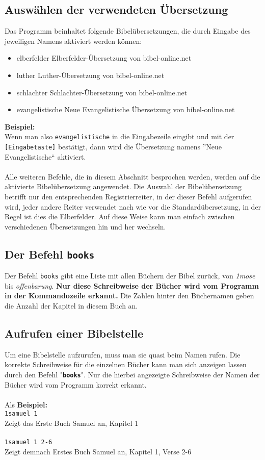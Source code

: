 \documentclass[a4paper]{scrartcl}
\let\origitem\item
\renewcommand{\item}{\normalfont\origitem}
\newcommand{\ttitem}{\normalfont\ttfamily\origitem}
\begin{document}
\subsection{Auswählen der verwendeten Übersetzung}

Das Programm beinhaltet folgende Bibelübersetzungen, die durch Eingabe des jeweiligen Namens aktiviert werden können:

\begin{itemize}
\ttitem elberfelder
	\subitem Elberfelder-Übersetzung von bibel-online.net
\ttitem luther
	\subitem Luther-Übersetzung von bibel-online.net
\ttitem schlachter
	\subitem Schlachter-Übersetzung von bibel-online.net
\ttitem evangelistische
	\subitem Neue Evangelistische Übersetzung von bibel-online.net
\end{itemize}
\noindent
\textbf{Beispiel:}\\
Wenn man also \texttt{evangelistische} in die Eingabezeile eingibt und mit der \texttt{[Eingabetaste]} bestätigt, dann wird die Übersetzung namens ''Neue Evangelistische`` aktiviert.\\
\\ \noindent
Alle weiteren Befehle, die in diesem Abschnitt besprochen werden, werden auf die aktivierte Bibelübersetzung angewendet. Die Auswahl der Bibelübersetzung betrifft nur den entsprechenden Registrierreiter, in der dieser Befehl aufgerufen wird, jeder andere Reiter verwendet nach wie vor die Standardübersetzung, in der Regel ist dies die Elberfelder. Auf diese Weise kann man einfach zwischen verschiedenen Übersetzungen hin und her wechseln.

\subsection{Der Befehl \texttt{books}}

Der Befehl \texttt{books} gibt eine Liste mit allen Büchern der Bibel zurück, von \textit{1mose} bis \textit{offenbarung}. \textbf{Nur diese Schreibweise der Bücher wird vom Programm in der Kommandozeile erkannt.} Die Zahlen hinter den Büchernamen geben die Anzahl der Kapitel in diesem Buch an.

\subsection{Aufrufen einer Bibelstelle}

Um eine Bibelstelle aufzurufen, muss man sie quasi beim Namen rufen.
Die korrekte Schreibweise für die einzelnen Bücher kann man sich anzeigen lassen durch den Befehl "\textbf{\texttt{books}}".
Nur die hierbei angezeigte Schreibweise der Namen der Bücher wird vom Programm korrekt erkannt.
\\\\
Als \textbf{Beispiel:}\\
\texttt{1samuel 1}\\
Zeigt das Erste Buch Samuel an, Kapitel 1\\
\\
\texttt{1samuel 1 2-6}\\
Zeigt demnach Erstes Buch Samuel an, Kapitel 1, Verse 2-6\\
\end{document}

